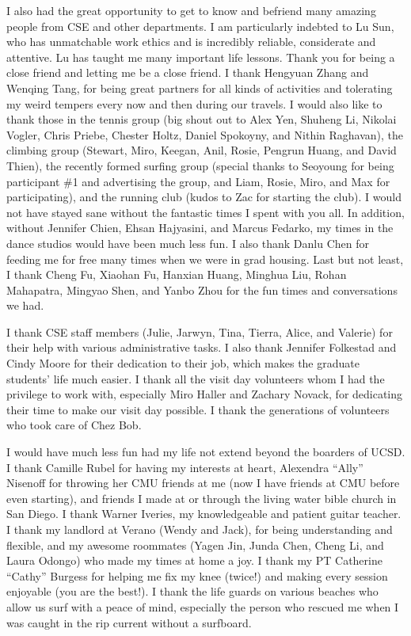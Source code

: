 \documentclass[12pt]{ucsddissertation}
\begin{document}
\begin{acknowledgements}
I also had the great opportunity to get to know and befriend many amazing people from CSE and other departments. I am particularly indebted to Lu Sun, who has unmatchable work ethics and is incredibly reliable, considerate and attentive. Lu has taught me many important life lessons. Thank you for being a close friend and letting me be a close friend. I thank Hengyuan Zhang and Wenqing Tang, for being great partners for all kinds of activities and tolerating my weird tempers every now and then during our travels. I would also like to thank those in the tennis group (big shout out to Alex Yen, Shuheng Li, Nikolai Vogler, Chris Priebe, Chester Holtz, Daniel Spokoyny, and Nithin Raghavan), the climbing group (Stewart, Miro, Keegan, Anil, Rosie, Pengrun Huang, and David Thien), the recently formed surfing group (special thanks to Seoyoung for being participant \#1 and advertising the group, and Liam, Rosie, Miro, and Max for participating), and the running club (kudos to Zac for starting the club). I would not have stayed sane without the fantastic times I spent with you all. In addition, without Jennifer Chien, Ehsan Hajyasini, and Marcus Fedarko,
my times in the dance studios would have been much less fun.
I also thank Danlu Chen for feeding me for free many times when we were in grad housing. Last but not least, I thank Cheng Fu, Xiaohan Fu, Hanxian Huang, Minghua Liu, Rohan Mahapatra, Mingyao Shen, and Yanbo Zhou for the fun times and conversations we had.

I thank CSE staff members (Julie, Jarwyn, Tina, Tierra, Alice, and Valerie) for their help with various administrative tasks. I also thank Jennifer Folkestad and Cindy Moore for their dedication to their job, which makes the graduate students' life much easier. I thank all the visit day volunteers whom I had the privilege to work with, especially Miro Haller and Zachary Novack, for dedicating their time to make our visit day possible. I thank the generations of volunteers who took care of Chez Bob.

I would have much less fun had my life not extend beyond the boarders of UCSD. I thank Camille Rubel for having my interests at heart, Alexendra ``Ally'' Nisenoff for throwing her CMU friends at me (now I have friends at CMU before even starting), and friends I made at or through the living water bible church in San Diego. I thank Warner Iveries, my knowledgeable and patient guitar teacher. I thank my landlord at Verano (Wendy and Jack), for being understanding and flexible, and my awesome roommates (Yagen Jin, Junda Chen, Cheng Li, and Laura Odongo) who made my times at home a joy. I thank my PT Catherine ``Cathy'' Burgess for helping me fix my knee (twice!) and making every session enjoyable (you are the best!). I thank the life guards on various beaches who allow us surf with a peace of mind, especially the person who rescued me when I was caught in the rip current without a surfboard.



\end{acknowledgements}
\end{document}
